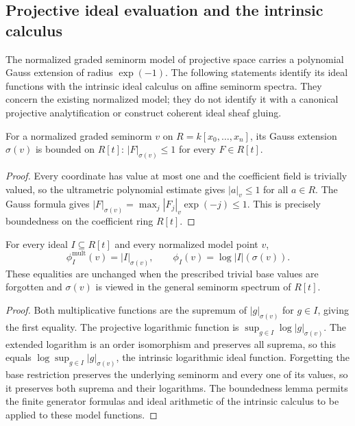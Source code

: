 \subsection{Projective ideal evaluation and the intrinsic calculus}
\label{subsec:projective-ideal-bridge}

The normalized graded seminorm model of projective space carries a polynomial
Gauss extension of radius $\exp(-1)$. The following statements identify its
ideal functions with the intrinsic ideal calculus on affine seminorm spectra.
They concern the existing normalized model; they do not identify it with a
canonical projective analytification or construct coherent ideal sheaf gluing.

\begin{lemma}
\label{projective:bounded-gauss-extension}
\leanok
{}
For a normalized graded seminorm $v$ on
$R=k[x_0,\ldots,x_n]$, its Gauss extension $\sigma(v)$ is bounded on
$R[t]$: $|F|_{\sigma(v)}\le1$ for every $F\in R[t]$.
\end{lemma}
\begin{proof}
Every coordinate has value at most one and the coefficient field is trivially
valued, so the ultrametric polynomial estimate gives $|a|_v\le1$ for all
$a\in R$. The Gauss formula gives
$|F|_{\sigma(v)}=\max_j |F_j|_v\exp(-j)\le1$.
This is precisely boundedness on the coefficient ring $R[t]$.
\end{proof}

\begin{theorem}
\label{projective:ideal-spectrum-bridge}
\leanok
{}
For every ideal $I\subseteq R[t]$ and every normalized model point $v$,
\[
 \phi_I^{\mathrm{mult}}(v)=|I|_{\sigma(v)},\qquad
 \phi_I(v)=\log|I|(\sigma(v)).
\]
These equalities are unchanged when the prescribed trivial base values are
forgotten and $\sigma(v)$ is viewed in the general seminorm spectrum of $R[t]$.
\end{theorem}
\begin{proof}
Both multiplicative functions are the supremum of $|g|_{\sigma(v)}$ for
$g\in I$, giving the first equality. The projective logarithmic function
is $\sup_{g\in I}\log|g|_{\sigma(v)}$. The extended logarithm is an order
isomorphism and preserves all suprema, so this equals
$\log\sup_{g\in I}|g|_{\sigma(v)}$, the intrinsic logarithmic ideal function.
Forgetting the base restriction preserves the underlying seminorm and every
one of its values, so it preserves both suprema and their logarithms.
The boundedness lemma permits the finite generator formulas and ideal arithmetic
of the intrinsic calculus to be applied to these model functions.
\end{proof}

